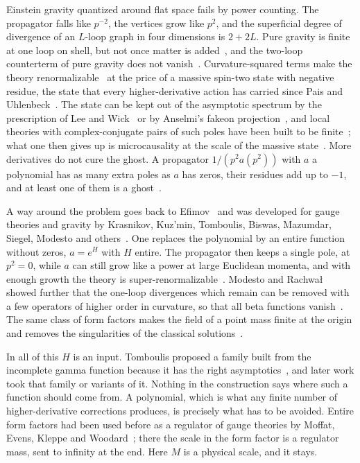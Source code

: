 \documentclass[aps,prd,10pt,twocolumn,superscriptaddress,nofootinbib,floatfix,longbibliography]{revtex4-2}
\begin{document}
Einstein gravity quantized around flat space fails by power counting. The propagator falls like $p^{-2}$, the vertices grow like $p^{2}$, and the superficial degree of divergence of an $L$-loop graph in four dimensions is $2+2L$. Pure gravity is finite at one loop on shell, but not once matter is added~\cite{tHooftVeltman1974}, and the two-loop counterterm of pure gravity does not vanish~\cite{GoroffSagnotti1986}. Curvature-squared terms make the theory renormalizable~\cite{Stelle1977,FradkinTseytlin1982,SalvioStrumia2014} at the price of a massive spin-two state with negative residue, the state that every higher-derivative action has carried since Pais and Uhlenbeck~\cite{PaisUhlenbeck1950,Stelle1978}. The state can be kept out of the asymptotic spectrum by the prescription of Lee and Wick~\cite{LeeWick1969,GrinsteinOConnellWise2008} or by Anselmi's fakeon projection~\cite{Anselmi2018,DonoghueMenezes2019}, and local theories with complex-conjugate pairs of such poles have been built to be finite~\cite{ModestoShapiro2016,Modesto2016}; what one then gives up is microcausality at the scale of the massive state~\cite{AsoreyRachwalShapiro2018}. More derivatives do not cure the ghost. A propagator $1/(p^2a(p^2))$ with $a$ a polynomial has as many extra poles as $a$ has zeros, their residues add up to $-1$, and at least one of them is a ghost~\cite{Shapiro2015}.

A way around the problem goes back to Efimov~\cite{Efimov1967} and was developed for gauge theories and gravity by Krasnikov, Kuz'min, Tomboulis, Biswas, Mazumdar, Siegel, Modesto and others~\cite{Krasnikov1987,Kuzmin1989,Tomboulis1997,BiswasMazumdarSiegel2006,BGKM2012,Modesto2012,ModestoRachwal2014}. One replaces the polynomial by an entire function without zeros, $a=e^{H}$ with $H$ entire. The propagator then keeps a single pole, at $p^2=0$, while $a$ can still grow like a power at large Euclidean momenta, and with enough growth the theory is super-renormalizable~\cite{Tomboulis2015,CalcagniModesto2015,ModestoRachwal2017}. Modesto and Rachwa{\l} showed further that the one-loop divergences which remain can be removed with a few operators of higher order in curvature, so that all beta functions vanish~\cite{ModestoRachwal2014}. The same class of form factors makes the field of a point mass finite at the origin and removes the singularities of the classical solutions~\cite{BGKM2012,Buoninfante2018,BuoninfanteLambiaseMazumdar2019}.

In all of this $H$ is an input. Tomboulis proposed a family built from the incomplete gamma function because it has the right asymptotics~\cite{Tomboulis1997}, and later work took that family or variants of it. Nothing in the construction says where such a function should come from. A polynomial, which is what any finite number of higher-derivative corrections produces, is precisely what has to be avoided. Entire form factors had been used before as a regulator of gauge theories by Moffat, Evens, Kleppe and Woodard~\cite{Moffat1990,EvensMoffatKleppeWoodard1991,KleppeWoodard1992}; there the scale in the form factor is a regulator mass, sent to infinity at the end. Here $M$ is a physical scale, and it stays.
\end{document}
